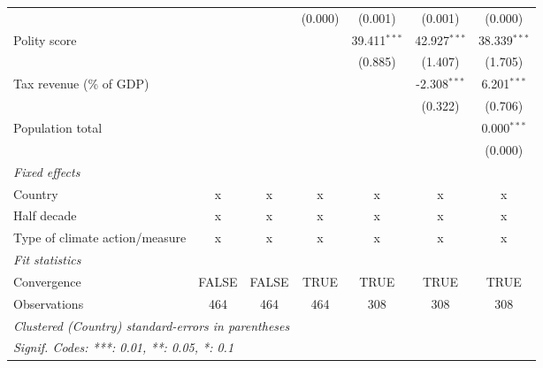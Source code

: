 \begin{tabular}{lcccccc}
                                                          &                  &                     & (0.000)        & (0.001)          & (0.001)          & (0.000)\\   
   Polity score                                           &                  &                     &                & 39.411$^{***}$   & 42.927$^{***}$   & 38.339$^{***}$\\   
                                                          &                  &                     &                & (0.885)          & (1.407)          & (1.705)\\   
   Tax revenue (\% of GDP)                                &                  &                     &                &                  & -2.308$^{***}$   & 6.201$^{***}$\\   
                                                          &                  &                     &                &                  & (0.322)          & (0.706)\\   
   Population total                                       &                  &                     &                &                  &                  & 0.000$^{***}$\\   
                                                          &                  &                     &                &                  &                  & (0.000)\\   
   \emph{Fixed effects}\\
   Country                                                & x                & x                   & x              & x                & x                & x\\  
   Half decade                                            & x                & x                   & x              & x                & x                & x\\  
   Type of climate action/measure                         & x                & x                   & x              & x                & x                & x\\  
   \midrule \emph{Fit statistics}\\
   Convergence                                            &FALSE             & FALSE               & TRUE           & TRUE             & TRUE             & TRUE\\  
   Observations                                           & 464              & 464                 & 464            & 308              & 308              & 308\\  
   \midrule
   \multicolumn{7}{l}{\emph{Clustered (Country) standard-errors in parentheses}}\\
   \multicolumn{7}{l}{\emph{Signif. Codes: ***: 0.01, **: 0.05, *: 0.1}}\\
\end{tabular}
\par\endgroup



